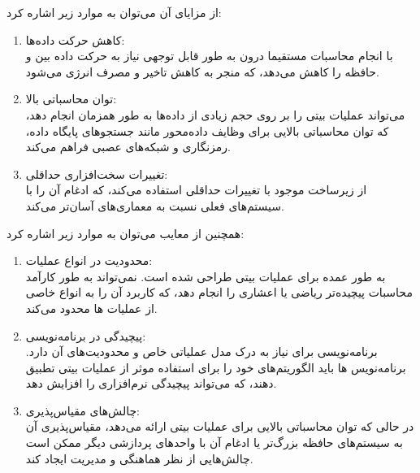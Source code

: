 \documentclass[12pt]{exam}
\begin{document}
\begin{questions}
\begin{enumerate}
از مزایای آن می‌توان به موارد زیر اشاره کرد:

\begin{enumerate}
	\item کاهش حرکت داده‌ها:\\
با انجام محاسبات مستقیما درون  به طور قابل توجهی نیاز به حرکت داده بین  و حافظه را کاهش می‌دهد، که منجر به کاهش تاخیر و مصرف انرژی می‌شود.

	\item توان محاسباتی بالا:\\
می‌تواند عملیات بیتی را بر روی حجم زیادی از داده‌ها به طور همزمان انجام دهد، که توان محاسباتی بالایی برای وظایف داده‌محور مانند جستجوهای پایگاه داده، رمزنگاری و شبکه‌های عصبی فراهم می‌کند.


	\item تغییرات سخت‌افزاری حداقلی:\\
از زیرساخت  موجود با تغییرات حداقلی استفاده می‌کند، که ادغام آن را با سیستم‌های فعلی نسبت به معماری‌های  آسان‌تر می‌کند.
\end{enumerate}


همچنین از معایب  می‌توان به موارد زیر اشاره کرد:

\begin{enumerate}
	\item محدودیت در انواع عملیات:\\
به طور عمده برای عملیات بیتی طراحی شده است. نمی‌تواند به طور کارآمد محاسبات پیچیده‌تر ریاضی یا اعشاری را انجام دهد، که کاربرد آن را به انواع خاصی از عملیات ها محدود می‌کند.


	\item پیچیدگی در برنامه‌نویسی:\\
برنامه‌نویسی برای  نیاز به درک مدل عملیاتی خاص و محدودیت‌های آن دارد. برنامه‌نویس ها باید الگوریتم‌های خود را برای استفاده موثر از عملیات بیتی تطبیق دهند، که می‌تواند پیچیدگی نرم‌افزاری را افزایش دهد.

	\item چالش‌های مقیاس‌پذیری:\\
در حالی که  توان محاسباتی بالایی برای عملیات بیتی ارائه می‌دهد، مقیاس‌پذیری آن به سیستم‌های حافظه بزرگ‌تر یا ادغام آن با واحدهای پردازشی دیگر ممکن است چالش‌هایی از نظر هماهنگی و مدیریت ایجاد کند.
\end{enumerate}


\end{enumerate}


		
		
		
		
		
	
 \end{questions}
\end{document}
